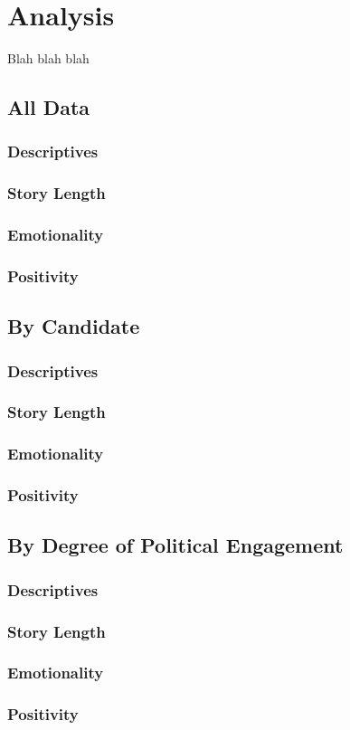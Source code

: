 
 \chapter{Analysis}
 Blah blah blah

 \section{All Data}
 \subsection{Descriptives}
 \subsection{Story Length}
 \subsection{Emotionality}
 \subsection{Positivity}

  \section{By Candidate}
 \subsection{Descriptives}
 \subsection{Story Length}
 \subsection{Emotionality}
 \subsection{Positivity}


  \section{By Degree of Political Engagement}
 \subsection{Descriptives}
 \subsection{Story Length}
 \subsection{Emotionality}
 \subsection{Positivity}

  